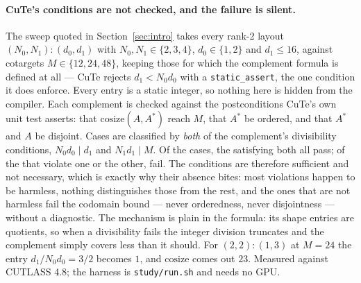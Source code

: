 \documentclass[11pt]{article}
\theoremstyle{definition}
\newcommand{\cosize}{\mathrm{cosize}}
\begin{document}
\paragraph{CuTe's conditions are not checked, and the failure is silent.}
The sweep quoted in Section~\ref{sec:intro} takes every rank-2 layout
$(N_0,N_1){:}(d_0,d_1)$ with $N_0, N_1 \in \{2,3,4\}$, $d_0 \in \{1,2\}$ and
$d_1 \le 16$, against cotargets $M \in \{12,24,48\}$, keeping those for which
the complement formula is defined at all --- CuTe rejects $d_1 < N_0 d_0$ with
a \texttt{static\_assert}, the one condition it does enforce. Every entry is a
static integer, so nothing here is hidden from the compiler. Each complement is
checked against the postconditions CuTe's own unit test asserts: that
$\cosize(A, A^{*})$ reach $M$, that $A^{*}$ be ordered, and that $A^{*}$ and
$A$ be disjoint. Cases are classified by \emph{both} of the complement's
divisibility conditions, $N_0 d_0 \mid d_1$ and $N_1 d_1 \mid M$. Of the
\cuteCompTotal{} cases, the \cuteCompSatisfied{} satisfying both all pass; of
the \cuteCompViolated{} that violate one or the other,
\cuteCompViolatedBroken{} fail. The conditions are therefore sufficient and
not necessary, which is exactly why their absence bites: most violations
happen to be harmless, nothing distinguishes those from the rest, and the ones
that are not harmless fail the codomain bound --- never orderedness, never
disjointness --- without a diagnostic. The mechanism is plain in the formula:
its shape entries are quotients, so when a divisibility fails the integer
division truncates and the complement simply covers less than it should. For
$(2,2){:}(1,3)$ at $M = 24$ the entry $d_1 / N_0 d_0 = 3/2$ becomes $1$, and
$\cosize$ comes out $23$. Measured against CUTLASS 4.8; the
harness is \texttt{study/run.sh} and needs no GPU.
\end{document}
